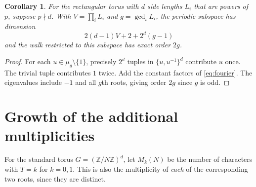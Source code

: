 \documentclass[10pt]{article}
\newtheorem{corollary}[theorem]{Corollary}
\newcommand{\Z}{\mathbb Z}
\begin{document}
\begin{corollary}\label{c:dim}
For the rectangular torus with $d$ side lengths $L_i$ that are powers of
$p$, suppose $p\nmid d$. With $V=\prod_i L_i$ and $g=\gcd_i L_i$, the
periodic subspace has dimension
\[
 2(d-1)V+2+2^d(g-1)
\]
and the walk restricted to this subspace has exact order $2g$.
\end{corollary}
\begin{proof}
For each $u\in\mu_g\setminus\{1\}$, precisely $2^d$ tuples in
$\{u,u^{-1}\}^d$ contribute $u$ once. The trivial tuple contributes $1$
twice. Add the constant factors of \eqref{eq:fourier}. The eigenvalues
include $-1$ and all $g$th roots, giving order $2g$ since $g$ is odd.
\end{proof}

\section{Growth of the additional multiplicities}
For the standard torus $G=(\Z/N\Z)^d$, let $M_k(N)$ be the number of
characters with $T=k$ for $k=0,1$. This is also the multiplicity of
\emph{each} of the corresponding two roots, since they are distinct.
\end{document}
